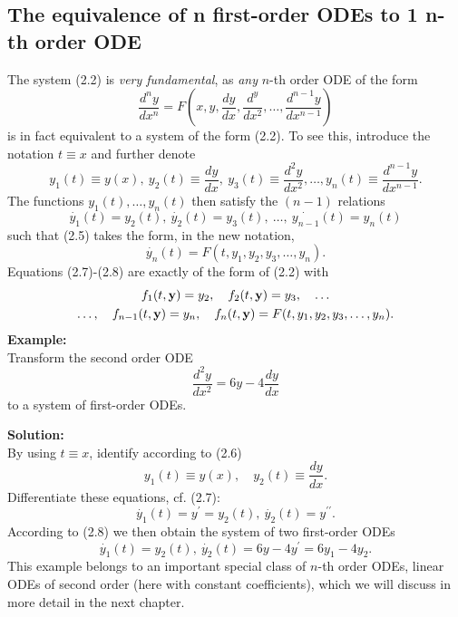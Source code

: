 \documentclass[11pt,a4paper,twoside]{report}
\begin{document}
	\subsection*{The equivalence of n first-order ODEs to 1 n-th order ODE}
	The system (2.2) is \textit{very fundamental}, as \textit{any} $n$-th order ODE of the form
	\begin{equation}
		\frac{d^ny}{dx^n} = F\left(x,y,\frac{dy}{dx},\frac{d^y}{dx^2},\ldots, \frac{d^{n-1}y}{dx^{n-1}}\right)
	\end{equation}
	is in fact equivalent to a system of the form (2.2). To see this, introduce the notation $t \equiv x$ and further denote
	\begin{equation}
		y_1(t) \equiv y(x),\ 
		y_2(t) \equiv \frac{dy}{dx},\ 
		y_3(t) \equiv \frac{d^2y}{dx^2},\ldots,
		y_n(t)\equiv \frac{d^{n-1}y}{dx^{n-1}}.
	\end{equation}
	The functions $y_1(t),\ldots ,y_n(t)$ then satisfy the $(n − 1)$ relations
	\begin{equation}
		\dot{y_1}(t) = y_2(t),\ 
		\dot{y_2}(t) = y_3(t),\ \ldots,\ 
		\dot{y_{n-1}}(t) = y_n(t)
	\end{equation}
	such that (2.5) takes the form, in the new notation,
	\begin{equation}
		\dot{y_n}(t) = F(t, y_1, y_2, y_3, \ldots,y_n).
	\end{equation}
	Equations (2.7)-(2.8) are exactly of the form of (2.2) with
	\begin{equation}
		\begin{gathered}
			f_1(t,\vb{y})=y_2, \quad f_2(t,\vb{y})=y_3,\quad \ldots\\
			\ldots, \quad f_{n-1}(t,\vb{y})=y_n, \quad f_n(t,\vb{y})=F(t,y_1,y_2,y_3,\ldots,y_n).
		\end{gathered}
	\end{equation}
	\textbf{Example:}\\
	Transform the second order ODE
	$$
	\frac{d^2y}{dx^2} = 6y-4\frac{dy}{dx}
	$$
	to a system of first-order ODEs.\par
	\textbf{Solution:}\\
	By using $t \equiv x$, identify according to (2.6)
	$$
	y_1(t)\equiv y(x),\quad y_2(t)\equiv \frac{dy}{dx}.
	$$
	Differentiate these equations, cf. (2.7):
	$$
	\dot{y_1}(t) = y^\prime = y_2(t),\ \dot{y_2}(t)=y^{\prime\prime}.
	$$
	According to (2.8) we then obtain the system of two first-order ODEs
	$$
	\dot{y_1}(t) = y_2(t),\ \dot{y_2}(t) = 6y-4y^\prime = 6y_1-4y_2.
	$$
	This example belongs to an important special class of $n$-th order ODEs, linear ODEs of second order (here with constant coefficients), which we will discuss in more detail in the next chapter.
\end{document}
